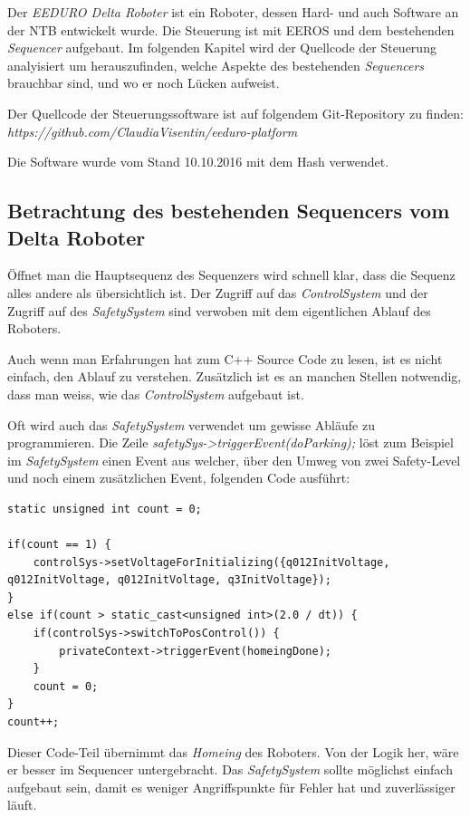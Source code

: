 Der \textit{EEDURO Delta Roboter} ist ein Roboter, dessen Hard- und auch Software an der NTB entwickelt wurde.
Die Steuerung ist mit EEROS und dem bestehenden \textit{Sequencer} aufgebaut.
Im folgenden Kapitel wird der Quellcode der Steuerung analyisiert um herauszufinden, welche Aspekte des bestehenden \textit{Sequencers} brauchbar sind, und wo er noch Lücken aufweist.

Der Quellcode der Steuerungssoftware ist auf folgendem Git-Repository zu finden: \\
\textit{https://github.com/ClaudiaVisentin/eeduro-platform }

Die Software wurde vom Stand 10.10.2016 mit dem Hash \textit{} verwendet.


\subsection{Betrachtung des bestehenden Sequencers vom Delta Roboter}
Öffnet man die Hauptsequenz des Sequenzers wird schnell klar, dass die Sequenz alles andere als übersichtlich ist.
Der Zugriff auf das \textit{ControlSystem} und der Zugriff auf des \textit{SafetySystem} sind verwoben mit dem eigentlichen Ablauf des Roboters.

Auch wenn man Erfahrungen hat zum C++ Source Code zu lesen, ist es nicht einfach, den Ablauf zu verstehen.
Zusätzlich ist es an manchen Stellen notwendig, dass man weiss, wie das \textit{ControlSystem} aufgebaut ist.

Oft wird auch das \textit{SafetySystem} verwendet um gewisse Abläufe zu programmieren.
Die Zeile \textit{safetySys->triggerEvent(doParking);} löst zum Beispiel im \textit{SafetySystem} einen Event aus welcher, über den Umweg von zwei Safety-Level und noch einem zusätzlichen Event, folgenden Code ausführt:

\begin{lstlisting}
static unsigned int count = 0;

if(count == 1) {
	controlSys->setVoltageForInitializing({q012InitVoltage, q012InitVoltage, q012InitVoltage, q3InitVoltage});
}
else if(count > static_cast<unsigned int>(2.0 / dt)) {
	if(controlSys->switchToPosControl()) {
		privateContext->triggerEvent(homeingDone);
	}
	count = 0;
}
count++;
\end{lstlisting}

Dieser Code-Teil übernimmt das \textit{Homeing} des Roboters.
Von der Logik her, wäre er besser im Sequencer untergebracht.
Das \textit{SafetySystem} sollte möglichst einfach aufgebaut sein, damit es weniger Angriffspunkte für Fehler hat und zuverlässiger läuft.
